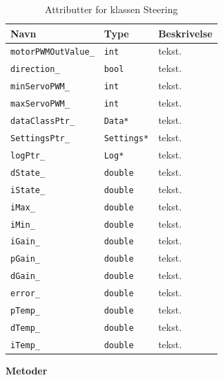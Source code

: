 \begin{table}[H]
\begin{tabularx}{\textwidth}{| Z | Z | L{10cm} |} \hline
Navn & Type & Beskrivelse \\\hline
\texttt{motorPWMOutValue\_} & \texttt{int} &tekst.\\\hline
\texttt{direction\_} & \texttt{bool} &tekst.\\\hline
\texttt{minServoPWM\_} & \texttt{int} &tekst.\\\hline
\texttt{maxServoPWM\_} & \texttt{int} &tekst.\\\hline
\texttt{dataClassPtr\_} & \texttt{Data*} &tekst.\\\hline
\texttt{SettingsPtr\_} & \texttt{Settings*} &tekst.\\\hline
\texttt{logPtr\_} & \texttt{Log*} &tekst.\\\hline
\texttt{dState\_} & \texttt{double } &tekst.\\\hline
\texttt{iState\_} & \texttt{double} &tekst.\\\hline
\texttt{iMax\_} & \texttt{double } &tekst.\\\hline
\texttt{iMin\_} & \texttt{double } &tekst.\\\hline
\texttt{iGain\_} & \texttt{double } &tekst.\\\hline
\texttt{pGain\_} & \texttt{double } &tekst.\\\hline
\texttt{dGain\_} & \texttt{double } &tekst.\\\hline
\texttt{error\_} & \texttt{double } &tekst.\\\hline
\texttt{pTemp\_} & \texttt{double } &tekst.\\\hline
\texttt{dTemp\_} & \texttt{double } &tekst.\\\hline
\texttt{iTemp\_} & \texttt{double } &tekst.\\\hline


\end{tabularx}
\caption{Attributter for klassen Steering}
\label{table:attr_steering}
\end{table}

\newpage
\textbf{Metoder} 


